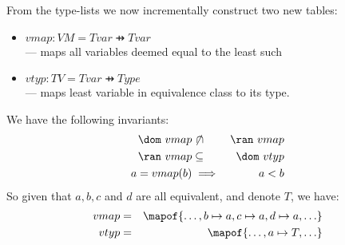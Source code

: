 From the type-lists we now incrementally construct two new tables:
\begin{itemize}
  \item $vmap : VM = Tvar \pfun Tvar$
    \\--- maps all variables deemed equal to the least such
  \item $vtyp : TV = Tvar \pfun Type$
    \\--- maps least variable in equivalence class to its type.
\end{itemize}
We have the following invariants:
\begin{eqnarray*}
   \dom~vmap &\not{\!\cap}& \ran~vmap
\\ \ran~vmap &\subseteq& \dom~vtyp
\\ a = vmap(b) &\implies& a < b
\end{eqnarray*}
So given that $a,b,c$ and $d$ are all equivalent, and denote $T$,
we have:
\begin{eqnarray*}
   vmap &=& \mapof{\ldots,b \mapsto a,c \mapsto a,d\mapsto a,\ldots}
\\ vtyp &=& \mapof{\ldots,a \mapsto T,\ldots}
\end{eqnarray*}